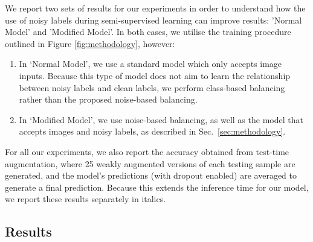 \documentclass[10pt,twocolumn,letterpaper]{article}
\begin{document}
We report two sets of results for our experiments in order to understand how the use of noisy labels during semi-supervised learning can improve results: 'Normal Model' and 'Modified Model'. In both cases, we utilise the training procedure outlined in Figure \ref{fig:methodology}, however:
\begin{enumerate}[label=\arabic*)]
    \item In `Normal Model', we use a standard model which only accepts image inputs. Because this type of model does not aim to learn the relationship between noisy labels and clean labels, we perform class-based balancing rather than the proposed noise-based balancing.
    \item In `Modified Model', we use 
    noise-based balancing, as well as the  model that accepts images and noisy labels, as described in Sec.~\ref{sec:methodology}.
\end{enumerate}
For all our experiments, we also report the accuracy obtained from test-time augmentation, where 25 weakly augmented versions of each testing sample are generated, and the model's predictions (with dropout enabled) are averaged to generate a final prediction. Because this extends the inference time for our model, we report these results separately in italics.

\subsection{Results}

\begin{table}[t!]
    \begin{center}
    \end{center}
    \caption{Test accuracy (\%) for Animal10N. Top methods within $1\%$ in \textbf{bold} (Results other than ours are from \cite{sarfraz2021noisy}).}
    \label{tab:animal10n_2}
\end{table}
\end{document}
